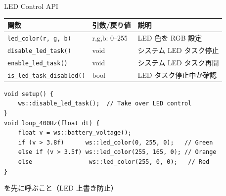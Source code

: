 \begin{frame}[fragile]{LED Control API}
  \vspace{0.3em}
  {\small
  \begin{tabular}{lll}
    \hline
    \textbf{関数} & \textbf{引数/戻り値} & \textbf{説明} \\
    \hline
    \texttt{led\_color(r, g, b)}      & r,g,b: 0--255 & LED 色を RGB 設定 \\
    \texttt{disable\_led\_task()}     & void           & システム LED タスク停止 \\
    \texttt{enable\_led\_task()}      & void           & システム LED タスク再開 \\
    \texttt{is\_led\_task\_disabled()} & bool          & LED タスク停止中か確認 \\
    \hline
  \end{tabular}
  }

  \vspace{0.3em}

  \begin{lstlisting}[style=sfcpp, basicstyle=\ttfamily\scriptsize]
void setup() {
    ws::disable_led_task();  // Take over LED control
}
void loop_400Hz(float dt) {
    float v = ws::battery_voltage();
    if (v > 3.8f)      ws::led_color(0, 255, 0);   // Green
    else if (v > 3.5f) ws::led_color(255, 165, 0); // Orange
    else                ws::led_color(255, 0, 0);   // Red
}
  \end{lstlisting}

  \vspace{0.2em}
  {\footnotesize {}  を先に呼ぶこと（LED 上書き防止）}
\end{frame}

